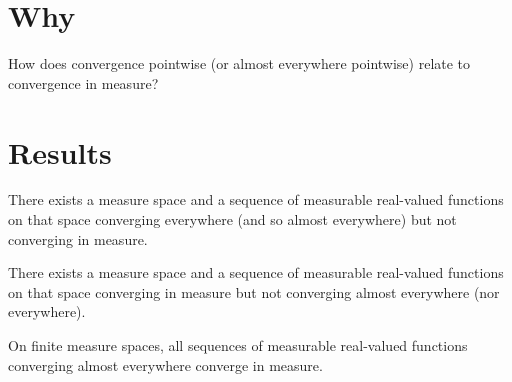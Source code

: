 
\section*{Why}

How does convergence pointwise (or almost everywhere pointwise) relate to convergence in measure?

\section*{Results}

\begin{proposition}
There exists
a measure space
and a sequence of
measurable
real-valued functions
on that space
converging everywhere
(and so almost everywhere)
but not converging
in measure.
\end{proposition}

\begin{proposition}
There exists
a measure space
and a sequence of
measurable
real-valued functions
on that space
converging in measure
but not converging almost
everywhere (nor everywhere).
\end{proposition}

\begin{proposition}
On finite measure spaces, all sequences of measurable real-valued functions converging almost everywhere converge in measure.
\end{proposition}

